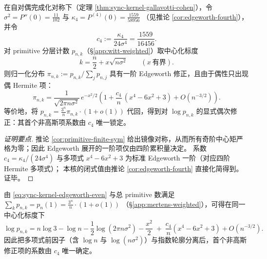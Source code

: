 \begin{theorem}\label{thm:sync-kernel-even-edgeworth-c4}
在自对偶完成化对称下（定理 \ref{thm:sync-kernel-gallavotti-cohen}），令
\(
\sigma^2=P''(0)=\frac{11}{102}
\)
与
\(
\kappa_4=P^{(4)}(0)=\frac{1559}{58956}
\)
（见推论 \ref{cor:edgeworth-fourth}），并令
\[
c_4:=\frac{\kappa_4}{24\sigma^4}=\frac{1559}{16456}.
\]
对 primitive 分层计数 \(p_{n,k}\)（\S\ref{app:witt-weighted}）取中心化标度
\[
k=\frac{n}{2}+x\sqrt{n\sigma^2}\qquad(x\ \text{有界}).
\]
则归一化分布 \(\pi_{n,k}:=p_{n,k}/\sum_j p_{n,j}\) 具有一阶 Edgeworth 修正，且由于偶性只出现偶 Hermite 项：
\begin{equation}\label{eq:sync-kernel-edgeworth-even}
\boxed{\;
\pi_{n,k}
=\frac{1}{\sqrt{2\pi n\sigma^2}}\,e^{-x^2/2}\left(1+\frac{c_4}{n}\,(x^4-6x^2+3)+O(n^{-3/2})\right).\;}
\end{equation}
等价地，将 \(p_{n,k}=\frac{3^n}{n}\pi_{n,k}\cdot(1+o(1))\) 代回，得到对 \(\log p_{n,k}\) 的显式偶次修正：其首个非高斯项系数由 \(c_4\) 唯一锁定。
\end{theorem}

\begin{proof}[证明要点]
推论 \ref{cor:primitive-finite-sym} 给出镜像对称，从而所有奇阶中心矩严格为零；因此 Edgeworth 展开的一阶项仅由四阶累积量决定。
系数 \(c_4=\kappa_4/(24\sigma^4)\) 与多项式 \(x^4-6x^2+3\) 为标准 Edgeworth 一阶（对应四阶 Hermite 多项式）；
本核的闭式值由推论 \ref{cor:edgeworth-fourth} 直接化简得到。证毕。
\end{proof}

\begin{remark}\label{rem:sync-kernel-edgeworth-log-form}
由 \eqref{eq:sync-kernel-edgeworth-even} 与总 primitive 数满足
\(
\sum_k p_{n,k}=p_n(1)=\frac{3^n}{n}\cdot(1+o(1))
\)
（\S\ref{app:mertens-weighted}），可得在同一中心化标度下
\[
\log p_{n,k}
=n\log 3-\log n-\frac12\log(2\pi n\sigma^2)-\frac{x^2}{2}
\;+\;\frac{c_4}{n}(x^4-6x^2+3)+O(n^{-3/2}).
\]
因此把多项式前因子（含 \(\log n\) 与 \(\log(n\sigma^2)\)）与指数轮廓分离后，首个非高斯修正项的系数由 \(c_4\) 唯一确定。
\end{remark}

